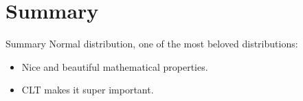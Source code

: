 \documentclass{beamer}
\begin{document}
\section*{Summary}

\begin{frame}{Summary}
  Normal distribution, one of the most beloved distributions:
  \begin{itemize}
  \item Nice and beautiful mathematical properties.
  \item CLT makes it super important.
  \end{itemize}

\end{frame}
\end{document}
